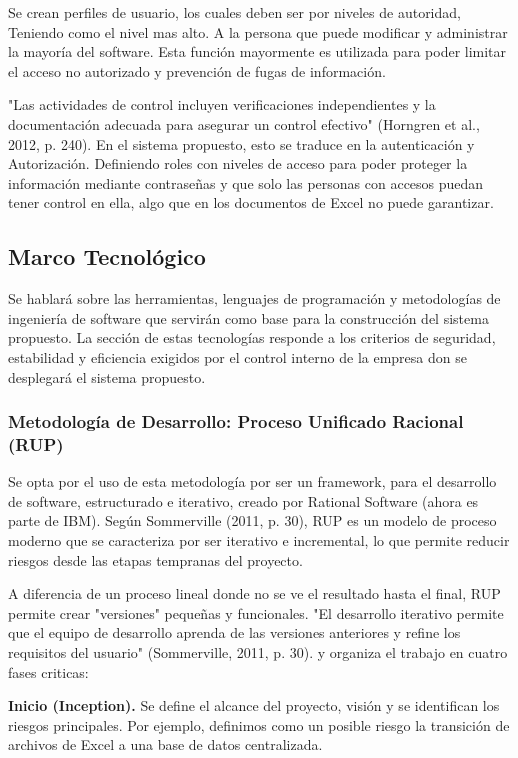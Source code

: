 Se crean perfiles de usuario, los cuales deben ser por niveles de autoridad, Teniendo como el nivel mas alto. A la persona que puede modificar y administrar la mayoría del software. Esta función mayormente es utilizada para poder limitar el acceso no autorizado y prevención de fugas de información.

"Las actividades de control incluyen verificaciones independientes y la documentación adecuada para asegurar un control efectivo" (Horngren et al., 2012, p. 240). En el sistema propuesto, esto se traduce en la autenticación y Autorización. Definiendo roles con niveles de acceso para poder proteger la información mediante contraseñas y que solo las personas con accesos puedan tener control en ella, algo que en los documentos de Excel no puede garantizar.

\subsection{Marco Tecnológico}

Se hablará sobre las herramientas, lenguajes de programación y metodologías de ingeniería de software que servirán como base para la construcción del sistema propuesto. La sección de estas tecnologías responde a los criterios de seguridad, estabilidad y eficiencia exigidos por el control interno de la empresa don se desplegará el sistema propuesto.

\subsubsection{Metodología de Desarrollo: Proceso Unificado Racional (RUP)}

Se opta por el uso de esta metodología por ser un framework, para el desarrollo de software, estructurado e iterativo, creado por Rational Software (ahora es parte de IBM). Según Sommerville (2011, p. 30), RUP es un modelo de proceso moderno que se caracteriza por ser iterativo e incremental, lo que permite reducir riesgos desde las etapas tempranas del proyecto.

A diferencia de un proceso lineal donde no se ve el resultado hasta el final, RUP permite crear "versiones" pequeñas y funcionales. "El desarrollo iterativo permite que el equipo de desarrollo aprenda de las versiones anteriores y refine los requisitos del usuario" (Sommerville, 2011, p. 30). y organiza el trabajo en cuatro fases criticas:

\textbf{Inicio (Inception).} Se define el alcance del proyecto, visión y se identifican los riesgos principales. Por ejemplo, definimos como un posible riesgo la transición de archivos de Excel a una base de datos centralizada.

